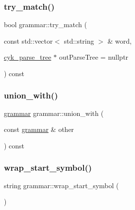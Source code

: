 \mbox{\label{classgrammar_af46a1bef1d9f68dc8cd00eb094c07430}} 
\subsubsection{\texorpdfstring{try\_match()}{try\_match()}\hspace{0.1cm}{\footnotesize\ttfamily [2/2]}}
{\footnotesize\ttfamily bool grammar\+::try\+\_\+match (\begin{DoxyParamCaption}\item[{const std\+::vector$<$ std\+::string $>$ \&}]{word,  }\item[{\mbox{\hyperlink{classcyk__parse__tree}{cyk\+\_\+parse\+\_\+tree}} $\ast$}]{out\+Parse\+Tree = {\ttfamily nullptr} }\end{DoxyParamCaption}) const}

\mbox{\label{classgrammar_a4fe5e40e6f636f65e42f8a0364cdbf4f}} 
\subsubsection{\texorpdfstring{union\_with()}{union\_with()}}
{\footnotesize\ttfamily \mbox{\hyperlink{classgrammar}{grammar}} grammar\+::union\+\_\+with (\begin{DoxyParamCaption}\item[{const \mbox{\hyperlink{classgrammar}{grammar}} \&}]{other }\end{DoxyParamCaption}) const}

\mbox{\label{classgrammar_a3c92b694459fcff389cadb9c08c60154}} 
\subsubsection{\texorpdfstring{wrap\_start\_symbol()}{wrap\_start\_symbol()}\hspace{0.1cm}{\footnotesize\ttfamily [1/2]}}
{\footnotesize\ttfamily string grammar\+::wrap\+\_\+start\+\_\+symbol (\begin{DoxyParamCaption}{ }\end{DoxyParamCaption})}

